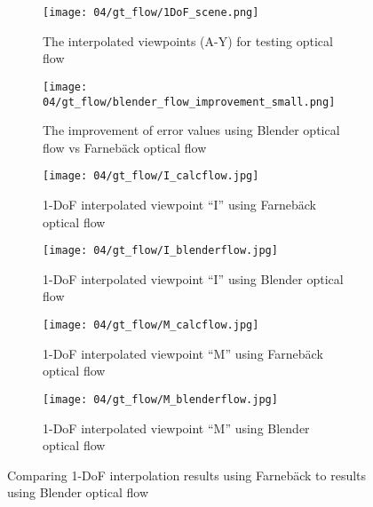 \begin{figure}
\centering
    \hfill
    \begin{subfigure}[b]{0.4\textwidth}
            \centering
            \texttt{[image: 04/gt\_flow/1DoF\_scene.png]}
            \caption{The interpolated viewpoints (A-Y) for testing optical flow}
    \end{subfigure}
    \hfill
    \begin{subfigure}[b]{0.4\textwidth}
            \centering
            \texttt{[image: 04/gt\_flow/blender\_flow\_improvement\_small.png]}
            \caption{The improvement of error values using Blender optical flow vs Farneb\"ack optical flow}
    \end{subfigure}
    \hfill
    \hfill
\par\bigskip
    \hfill
    \begin{subfigure}[b]{0.4\textwidth}
            \centering
            \texttt{[image: 04/gt\_flow/I\_calcflow.jpg]}
            \caption{1-DoF interpolated viewpoint ``I'' using Farneb\"ack optical flow}
    \end{subfigure}
    \hfill
    \begin{subfigure}[b]{0.4\textwidth}
            \centering
            \texttt{[image: 04/gt\_flow/I\_blenderflow.jpg]}
            \caption{1-DoF interpolated viewpoint ``I'' using Blender optical flow}
    \end{subfigure}
    \hfill
    \hfill
\par\bigskip
    \hfill
    \begin{subfigure}[b]{0.4\textwidth}
            \centering
            \texttt{[image: 04/gt\_flow/M\_calcflow.jpg]}
            \caption{1-DoF interpolated viewpoint ``M'' using Farneb\"ack optical flow}
    \end{subfigure}
    \hfill
    \begin{subfigure}[b]{0.4\textwidth}
            \centering
            \texttt{[image: 04/gt\_flow/M\_blenderflow.jpg]}
            \caption{1-DoF interpolated viewpoint ``M'' using Blender optical flow}
    \end{subfigure}
    \hfill
    \hfill
  \caption{Comparing 1-DoF interpolation results using Farneb\"ack to results using Blender optical flow} \label{fig:of_comparison}
\end{figure}


